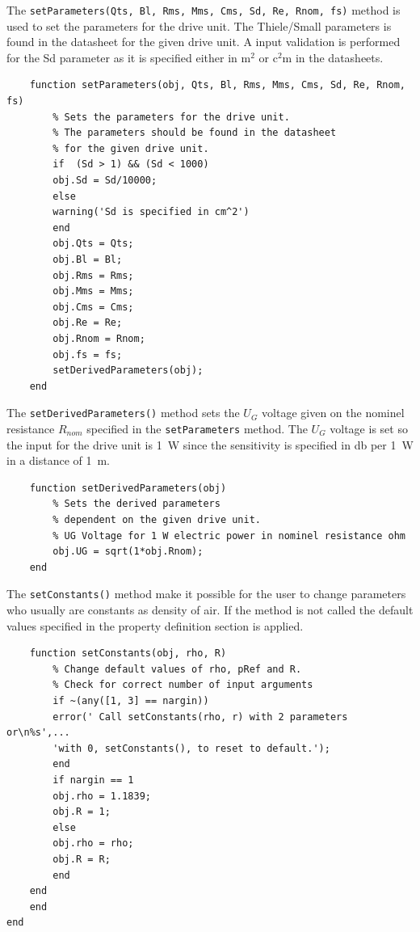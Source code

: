 The \texttt{setParameters(Qts, Bl, Rms, Mms, Cms, Sd, Re, Rnom, fs)} 
\newline method is used to set the parameters for the drive unit.
The Thiele/Small parameters is found in the datasheet for the given drive unit. 
A input validation is performed for the Sd parameter as it is specified either in $\si{\square\meter}$ or $\si{\square\centi\meter}$ in the datasheets.
\begin{verbatim}
	function setParameters(obj, Qts, Bl, Rms, Mms, Cms, Sd, Re, Rnom, fs)
	    % Sets the parameters for the drive unit.
	    % The parameters should be found in the datasheet
	    % for the given drive unit. 
	    if  (Sd > 1) && (Sd < 1000)
		obj.Sd = Sd/10000;
	    else
		warning('Sd is specified in cm^2')
	    end
	    obj.Qts = Qts;
	    obj.Bl = Bl;
	    obj.Rms = Rms;
	    obj.Mms = Mms;
	    obj.Cms = Cms;
	    obj.Re = Re;
	    obj.Rnom = Rnom;
	    obj.fs = fs;
	    setDerivedParameters(obj);
	end
\end{verbatim}

The \texttt{setDerivedParameters()} method sets the $U_G$ voltage given on the nominel resistance $R_{nom}$ specified in the \texttt{setParameters} method. 
The $U_G$ voltage is set so the input for the drive unit is \SI{1}{\watt} since the sensitivity is specified in \si{\decibel} per \SI{1}{\watt} in a distance of \SI{1}{\meter}.
\begin{verbatim}
	function setDerivedParameters(obj)
	    % Sets the derived parameters 
	    % dependent on the given drive unit.
	    % UG Voltage for 1 W electric power in nominel resistance ohm
	    obj.UG = sqrt(1*obj.Rnom);
	end
\end{verbatim}

The \texttt{setConstants()} method make it possible for the user to change parameters who usually are constants as density of air. 
If the method is not called the default values specified in the property definition section is applied.   
\begin{verbatim}
	function setConstants(obj, rho, R)
	    % Change default values of rho, pRef and R.	
	    % Check for correct number of input arguments
	    if ~(any([1, 3] == nargin))
		error(' Call setConstants(rho, r) with 2 parameters or\n%s',...
		'with 0, setConstants(), to reset to default.');
	    end
	    if nargin == 1
		obj.rho = 1.1839;
		obj.R = 1;
	    else
		obj.rho = rho;
		obj.R = R;
	    end
	end
    end
end
\end{verbatim}

